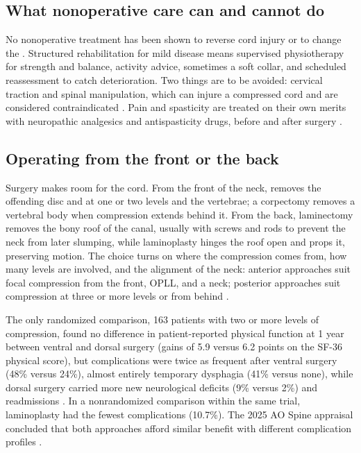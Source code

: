 \documentclass[11pt, letterpaper]{article}
\begin{document}
\subsection*{What nonoperative care can and cannot do}

No nonoperative treatment has been shown to reverse cord injury or to change the  \citep{rhee2013}. Structured rehabilitation for mild disease means supervised physiotherapy for strength and balance, activity advice, sometimes a soft collar, and scheduled reassessment to catch deterioration. Two things are to be avoided: cervical traction and spinal manipulation, which can injure a compressed cord and are considered contraindicated \citep{davies2018,mccormick2020}. Pain and \gls{spasticity} are treated on their own merits with neuropathic analgesics and antispasticity drugs, before and after surgery \citep{davies2018}.

\subsection*{Operating from the front or the back}

Surgery makes room for the cord. From the front of the neck,  removes the offending disc and  at one or two levels and  the vertebrae; a \gls{corpectomy} removes a vertebral body when compression extends behind it. From the back, \gls{laminectomy} removes the bony roof of the canal, usually with screws and rods to prevent the neck from later slumping, while \gls{laminoplasty} hinges the roof open and props it, preserving motion. The choice turns on where the compression comes from, how many levels are involved, and the alignment of the neck: anterior approaches suit focal compression from the front, OPLL, and a  neck; posterior approaches suit compression at three or more levels or from behind \citep{mccormick2020,badhiwala2020}.

The only randomized comparison, 163 patients with two or more levels of compression, found no difference in patient-reported physical function at 1 year between ventral and dorsal surgery (gains of 5.9 versus 6.2 points on the SF-36 physical score), but complications were twice as frequent after ventral surgery (48\% versus 24\%), almost entirely temporary \gls{dysphagia} (41\% versus none), while dorsal surgery carried more new neurological deficits (9\% versus 2\%) and readmissions \citep{ghogawala2021}. In a nonrandomized comparison within the same trial, laminoplasty had the fewest complications (10.7\%). The 2025 AO Spine appraisal concluded that both approaches afford similar benefit with different complication profiles \citep{fehlings2025}.
\end{document}
